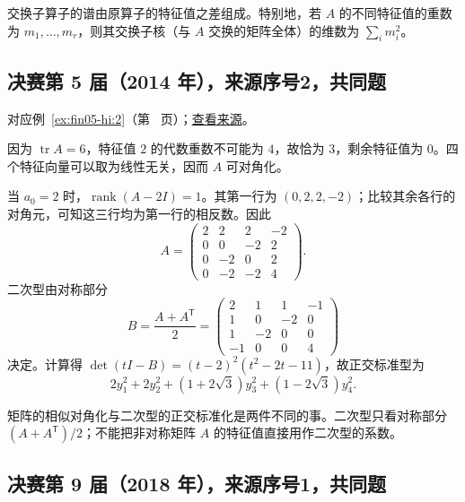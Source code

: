 \documentclass[UTF8,12pt,a4paper,fontset=fandol]{ctexart}
\begin{document}
\begin{remark}[方法与条件]

交换子算子的谱由原算子的特征值之差组成。特别地，若 $A$ 的不同特征值的重数为 $m_1,\ldots,m_r$，则其交换子核（与 $A$ 交换的矩阵全体）的维数为 $\sum_i m_i^2$。

\end{remark}

\subsection{决赛第 5 届（2014 年），来源序号2，共同题}\label{ans:fin05-hi:2}\label{pr:fin05-hi:2}

对应例~\ref{ex:fin05-hi:2}（第~\pageref{ex:fin05-hi:2} 页）；\href{https://github.com/lzxcr/cmc-mathematics/blob/64916fa1fdbc3e444a652eca204d5669058ee321/src/problems/finals/05/02.md}{查看来源}。

\begin{solve}

因为 $\operatorname{tr}A=6$，特征值 $2$ 的代数重数不可能为 $4$，故恰为 $3$，剩余特征值为 $0$。四个特征向量可以取为线性无关，因而 $A$ 可对角化。

当 $a_0=2$ 时，$\operatorname{rank}(A-2I)=1$。其第一行为 $(0,2,2,-2)$；比较其余各行的对角元，可知这三行均为第一行的相反数。因此
\[
A=\begin{pmatrix}2&2&2&-2\\0&0&-2&2\\0&-2&0&2\\0&-2&-2&4\end{pmatrix}.
\]
二次型由对称部分
\[
B=\frac{A+A^{\mathsf T}}2
=\begin{pmatrix}2&1&1&-1\\1&0&-2&0\\1&-2&0&0\\-1&0&0&4\end{pmatrix}
\]
决定。计算得
$\det(tI-B)=(t-2)^2(t^2-2t-11)$，故正交标准型为
\[
2y_1^2+2y_2^2+(1+2\sqrt3)y_3^2+(1-2\sqrt3)y_4^2.
\]

\end{solve}

\begin{remark}[方法与条件]

矩阵的相似对角化与二次型的正交标准化是两件不同的事。二次型只看对称部分 $(A+A^{\mathsf T})/2$；不能把非对称矩阵 $A$ 的特征值直接用作二次型的系数。

\end{remark}

\subsection{决赛第 9 届（2018 年），来源序号1，共同题}\label{ans:fin09-hi:1}\label{pr:fin09-hi:1}
\end{document}
